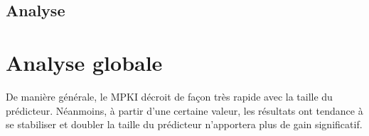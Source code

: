 \documentclass[a4paper]{article}
\begin{document}
\subsection{Analyse}



\section{Analyse globale}

De manière générale, le MPKI décroit de façon très rapide avec la taille du prédicteur.
Néanmoins, à partir d'une certaine valeur, les résultats ont tendance à se stabiliser et
doubler la taille du prédicteur n'apportera plus de gain significatif.
\end{document}
